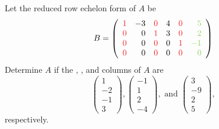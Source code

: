 \begin{exercise} \label{exercise 3.4.6}
Let the reduced row echelon form of \(A\) be
\[
    B = \left(\begin{array}{rrrrrr}
        \RED{1} & -3 & \RED{0} & 4 & \RED{0} & \GREEN{5} \\
        \RED{0} & 0 & \RED{1} & 3  & \RED{0} & \GREEN{2} \\
        \RED{0} & 0 & \RED{0} & 0  & \RED{1} & \GREEN{-1} \\
        \RED{0} & 0 & \RED{0} & 0  & \RED{0} & \GREEN{0}
    \end{array}\right)
\]
Determine \(A\) if the , , and  columns of \(A\) are
\[
    \begin{pmatrix} 1 \\ -2 \\ -1 \\ 3 \end{pmatrix},
    \begin{pmatrix} -1 \\ 1 \\ 2 \\ -4 \end{pmatrix},
    \text { and }
    \begin{pmatrix} 3 \\ -9 \\ 2 \\ 5 \end{pmatrix},
\]
respectively.
\end{exercise}

